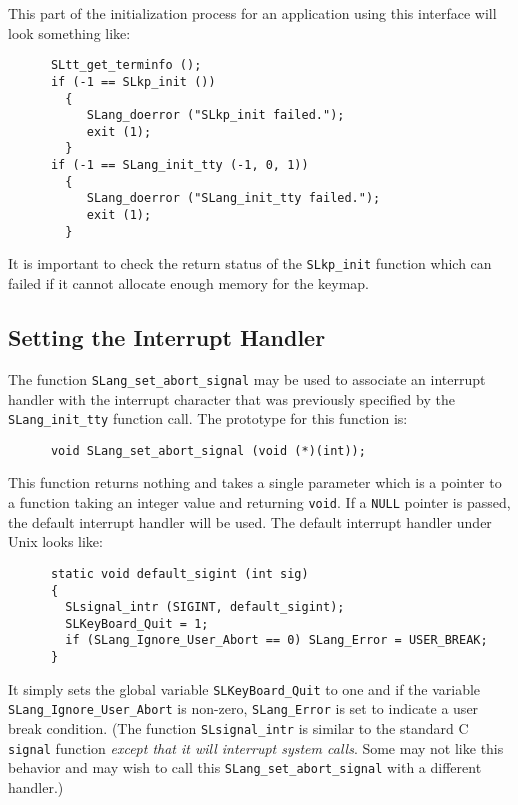   This part of the initialization process for an application using
  this interface will look something like:

\begin{verbatim} 
      SLtt_get_terminfo ();
      if (-1 == SLkp_init ())
        {
           SLang_doerror ("SLkp_init failed.");
           exit (1);
        }
      if (-1 == SLang_init_tty (-1, 0, 1))
        {
           SLang_doerror ("SLang_init_tty failed.");
           exit (1);
        }
\end{verbatim} 

  It is important to check the return status of the \verb|SLkp_init|
  function which can failed if it cannot allocate enough memory for
  the keymap.
 

\subsection{Setting the Interrupt Handler} %

  The function \verb|SLang_set_abort_signal| may be used to associate an
  interrupt handler with the interrupt character that was previously
  specified by the \verb|SLang_init_tty| function call.  The prototype for
  this function is:
\begin{verbatim}
      void SLang_set_abort_signal (void (*)(int));
\end{verbatim}
  This function returns nothing and takes a single parameter which is a
  pointer to a function taking an integer value and returning
  \verb|void|.  If a \verb|NULL| pointer is passed, the default \slang{}
  interrupt handler will be used. The \slang{} default interrupt handler
  under Unix looks like:
\begin{verbatim}
      static void default_sigint (int sig)
      {
        SLsignal_intr (SIGINT, default_sigint);
        SLKeyBoard_Quit = 1;
        if (SLang_Ignore_User_Abort == 0) SLang_Error = USER_BREAK;
      }
\end{verbatim} 
  It simply sets the global variable \verb|SLKeyBoard_Quit| to one and
  if the variable \verb|SLang_Ignore_User_Abort| is non-zero,
  \verb|SLang_Error| is set to indicate a user break condition.  (The
  function \verb|SLsignal_intr| is similar to the standard C
  \verb|signal| function {\em except that it will interrupt system
  calls}.  Some may not like this behavior and may wish to call
  this \verb|SLang_set_abort_signal| with a different handler.)

